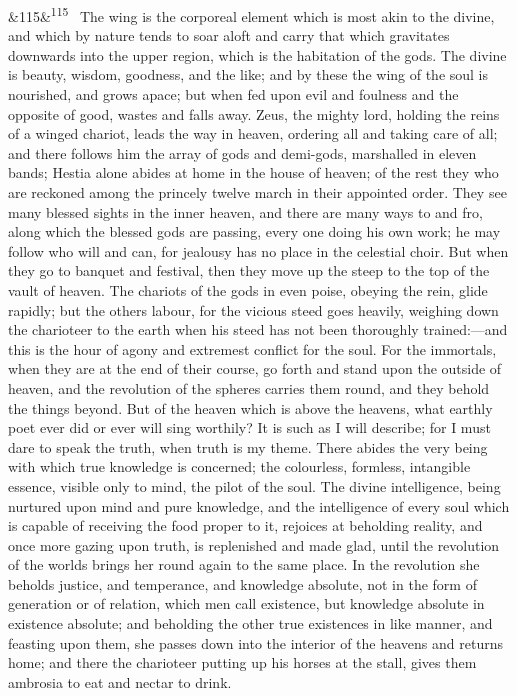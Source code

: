 \documentclass[12pt]{article}
\newcommand{\para}[1][]{\par\noindent\ifx&#1&\else\textsuperscript{\footnotesize #1}~\fi}
\begin{document}
\para[115] The wing is the corporeal element which is most akin to the divine, and which by nature tends to soar aloft and carry that which gravitates downwards into the upper region, which is the habitation of the gods. The divine is beauty, wisdom, goodness, and the like; and by these the wing of the soul is nourished, and grows apace; but when fed upon evil and foulness and the opposite of good, wastes and falls away. Zeus, the mighty lord, holding the reins of a winged chariot, leads the way in heaven, ordering all and taking care of all; and there follows him the array of gods and demi-gods, marshalled in eleven bands; Hestia alone abides at home in the house of heaven; of the rest they who are reckoned among the princely twelve march in their appointed order. They see many blessed sights in the inner heaven, and there are many ways to and fro, along which the blessed gods are passing, every one doing his own work; he may follow who will and can, for jealousy has no place in the celestial choir. But when they go to banquet and festival, then they move up the steep to the top of the vault of heaven. The chariots of the gods in even poise, obeying the rein, glide rapidly; but the others labour, for the vicious steed goes heavily, weighing down the charioteer to the earth when his steed has not been thoroughly trained:---and this is the hour of agony and extremest conflict for the soul. For the immortals, when they are at the end of their course, go forth and stand upon the outside of heaven, and the revolution of the spheres carries them round, and they behold the things beyond. But of the heaven which is above the heavens, what earthly poet ever did or ever will sing worthily? It is such as I will describe; for I must dare to speak the truth, when truth is my theme. There abides the very being with which true knowledge is concerned; the colourless, formless, intangible essence, visible only to mind, the pilot of the soul. The divine intelligence, being nurtured upon mind and pure knowledge, and the intelligence of every soul which is capable of receiving the food proper to it, rejoices at beholding reality, and once more gazing upon truth, is replenished and made glad, until the revolution of the worlds brings her round again to the same place. In the revolution she beholds justice, and temperance, and knowledge absolute, not in the form of generation or of relation, which men call existence, but knowledge absolute in existence absolute; and beholding the other true existences in like manner, and feasting upon them, she passes down into the interior of the heavens and returns home; and there the charioteer putting up his horses at the stall, gives them ambrosia to eat and nectar to drink.
\end{document}

